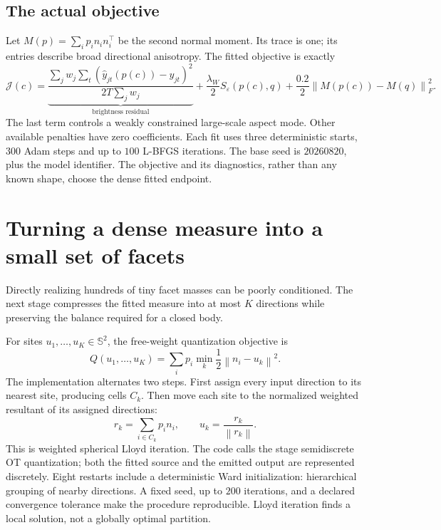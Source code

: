 \documentclass[11pt,a4paper]{article}
\newcommand{\sphere}{\mathbb{S}^{2}}
\newcommand{\norm}[1]{\left\lVert#1\right\rVert}
\begin{document}
\subsection*{The actual objective}
Let $M(p)=\sum_i p_i n_i n_i^\top$ be the second normal moment. Its trace is one; its entries describe broad directional anisotropy. The fitted objective is exactly
\begin{equation}
 \mathcal J(c)=
 \underbrace{\frac{\sum_j w_j\sum_t(\widehat y_{jt}(p(c))-y_{jt})^2}
 {2T\sum_j w_j}}_{\text{brightness residual}}
 +\frac{\lambda_W}{2}S_\varepsilon(p(c),q)
 +\frac{0.2}{2}\norm{M(p(c))-M(q)}_F^2.
 \label{eq:objective}
\end{equation}
The last term controls a weakly constrained large-scale aspect mode. Other available penalties have zero coefficients. Each fit uses three deterministic starts, $300$ Adam steps and up to $100$ L-BFGS iterations. The base seed is $20260820$, plus the model identifier. The objective and its diagnostics, rather than any known shape, choose the dense fitted endpoint.

\clearpage
\section{Turning a dense measure into a small set of facets}
Directly realizing hundreds of tiny facet masses can be poorly conditioned. The next stage compresses the fitted measure into at most $K$ directions while preserving the balance required for a closed body.

For sites $u_1,\ldots,u_K\in\sphere$, the free-weight quantization objective is
\begin{equation}
 Q(u_1,\ldots,u_K)=\sum_i p_i\min_k\frac12\norm{n_i-u_k}^2.
 \label{eq:quantization}
\end{equation}
The implementation alternates two steps. First assign every input direction to its nearest site, producing cells $C_k$. Then move each site to the normalized weighted resultant of its assigned directions:
\begin{equation}
 r_k=\sum_{i\in C_k}p_i n_i,\qquad u_k=\frac{r_k}{\norm{r_k}}.
 \label{eq:resultant}
\end{equation}
This is weighted spherical Lloyd iteration. The code calls the stage semidiscrete OT quantization; both the fitted source and the emitted output are represented discretely. Eight restarts include a deterministic Ward initialization: hierarchical grouping of nearby directions. A fixed seed, up to $200$ iterations, and a declared convergence tolerance make the procedure reproducible. Lloyd iteration finds a local solution, not a globally optimal partition.
\end{document}
